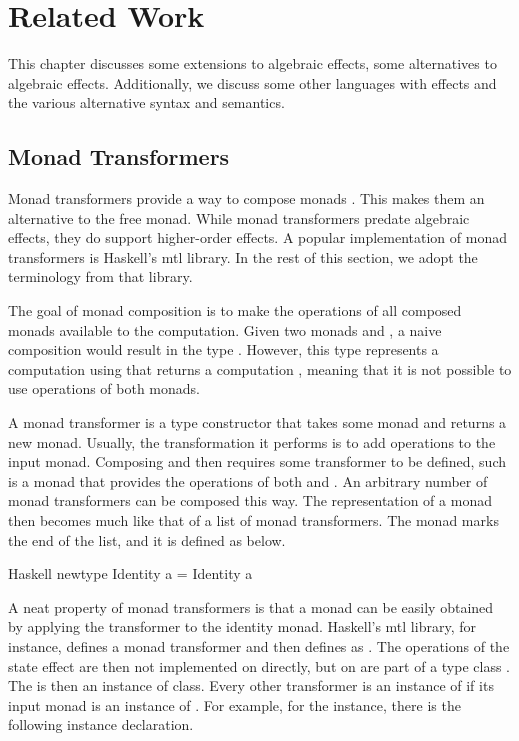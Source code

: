 \chapter{Related Work}\label{chap:related_work}

This chapter discusses some extensions to algebraic effects, some alternatives to algebraic effects. Additionally, we discuss some other languages with effects and the various alternative syntax and semantics.

\section{Monad Transformers}\label{sec:monad_transformers}

Monad transformers provide a way to compose monads \autocite{moggi_abstract_1989}. This makes them an alternative to the free monad. While monad transformers predate algebraic effects, they do support higher-order effects. A popular implementation of monad transformers is Haskell's mtl library. In the rest of this section, we adopt the terminology from that library.

The goal of monad composition is to make the operations of all composed monads available to the computation. Given two monads  and , a naive composition would result in the type . However, this type represents a computation using  that returns a computation , meaning that it is not possible to use operations of both monads.

A monad transformer is a type constructor that takes some monad and returns a new monad. Usually, the transformation it performs is to add operations to the input monad. Composing  and  then requires some transformer  to be defined, such  is a monad that provides the operations of both  and . An arbitrary number of monad transformers can be composed this way. The representation of a monad then becomes much like that of a list of monad transformers. The  monad marks the end of the list, and it is defined as below.

\begin{lst}{Haskell}
newtype Identity a = Identity a
\end{lst}

\noindent A neat property of monad transformers is that a monad can be easily obtained by applying the transformer to the identity monad. Haskell's mtl library, for instance, defines a monad transformer  and then defines  as . The operations of the state effect are then not implemented on  directly, but on are part of a type class . The  is then an instance of  class. Every other transformer is an instance of  if its input monad is an instance of . For example, for the  instance, there is the following instance declaration.

